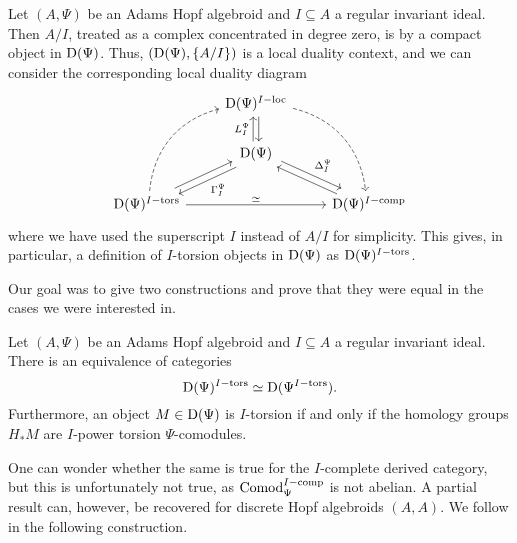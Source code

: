 \begin{construction}
    \label{ch0:const:local-duality-hopf-algebroid}
    Let $(A, \Psi)$ be an Adams Hopf algebroid and $I\subseteq A$ a regular invariant ideal. Then $A/I$, treated as a complex concentrated in degree zero, is by \cite[5.13]{barthel-heard-valenzuela_2018} a compact object in $\mathrm{D}(\Psi)$. Thus, $(\mathrm{D}(\Psi), \{A/I\})$ is a local duality context, and we can consider the corresponding local duality diagram
    \begin{equation*}
        \begin{tikzcd}
            & {\Der(\Psi)\Iloc} \\
            & {\Der(\Psi)} \\
            {\Der(\Psi)\Itors} && {\Der(\Psi)\Icomp}
            \arrow["L_I^\Psi", xshift=-2pt, from=2-2, to=1-2]
            \arrow[xshift=2pt, from=1-2, to=2-2]
            \arrow["\Delta_I^\Psi", yshift=2pt, xshift=2pt, from=2-2, to=3-3]
            \arrow[yshift=-2pt, xshift=-1pt, from=3-3, to=2-2]
            \arrow["\Gamma^\Psi_I", yshift=-2pt, xshift=2pt, from=2-2, to=3-1]
            \arrow[yshift=2pt, xshift=-1pt, from=3-1, to=2-2]
            \arrow[bend left=35, dashed, from=3-1, to=1-2]
            \arrow[bend left=35, dashed, from=1-2, to=3-3]
            \arrow["\simeq"', swap, from=3-1, to=3-3]
        \end{tikzcd}    
    \end{equation*}
    where we have used the superscript $I$ instead of $A/I$ for simplicity. This gives, in particular, a definition of $I$-torsion objects in $\mathrm{D}(\Psi)$ as $\mathrm{D}(\Psi)^{I-\mathrm{tors}}$. 
\end{construction}

Our goal was to give two constructions and prove that they were equal in the cases we were interested in. 

\begin{lemma}
    \label{ch0:lm:derived-torsion-if-homology-torsion}
    Let $(A,\Psi)$ be an Adams Hopf algebroid and $I\subseteq A$ a regular invariant ideal. There is an equivalence of categories 
    \[\mathrm{D}(\Psi)^{I-\mathrm{tors}}\simeq \mathrm{D}(\Psi^{I-\mathrm{tors}}).\] 
    Furthermore, an object $M\in \mathrm{D}(\Psi)$ is $I$-torsion if and only if the homology groups $H_* M$ are $I$-power torsion $\Psi$-comodules.
\end{lemma}

One can wonder whether the same is true for the $I$-complete derived category, but this is unfortunately not true, as $\mathrm{Comod}_\Psi^{I-\mathrm{comp}}$ is not abelian. A partial result can, however, be recovered for discrete Hopf algebroids $(A, A)$. We follow \cite{barthel-heard-valenzuela_2020} in the following construction. 

